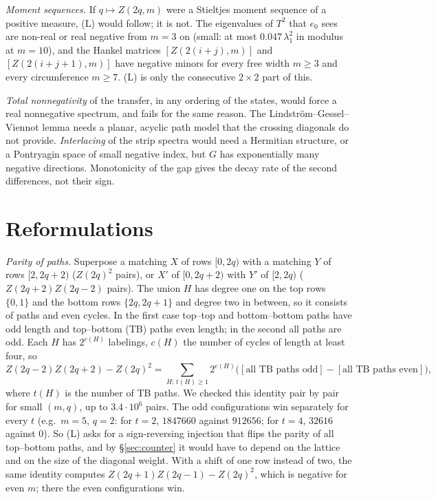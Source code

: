 \documentclass[11pt]{amsart}
\theoremstyle{definition}
\theoremstyle{remark}
\begin{document}
\emph{Moment sequences.} If $q \mapsto Z(2q, m)$ were a Stieltjes moment sequence of a positive
measure, (L) would follow; it is not. The eigenvalues of $T^2$ that $e_0$ sees are non-real or real
negative from $m = 3$ on (small: at most $0.047\,\lambda_1^2$ in modulus at $m = 10$), and the
Hankel matrices $[Z(2(i+j), m)]$ and $[Z(2(i+j+1), m)]$ have negative minors for every free width
$m \ge 3$ and every circumference $m \ge 7$. (L) is only the consecutive $2 \times 2$ part of this.

\emph{Total nonnegativity} of the transfer, in any ordering of the states, would force a real
nonnegative spectrum, and fails for the same reason. The
Lindstr\"om--Gessel--Viennot lemma needs a planar, acyclic path model that the crossing diagonals do
not provide. \emph{Interlacing} of the strip spectra would need a Hermitian structure, or a
Pontryagin space of small negative index, but $G$ has exponentially many negative directions.
Monotonicity of the gap gives the decay rate of the second differences, not their sign.

\section{Reformulations}\label{sec:reform}

\emph{Parity of paths.} Superpose a matching $X$ of rows $[0, 2q)$ with a matching $Y$ of rows
$[2, 2q+2)$ ($Z(2q)^2$ pairs), or $X'$ of $[0, 2q+2)$ with $Y'$ of $[2, 2q)$ ($Z(2q+2)Z(2q-2)$
pairs). The union $H$ has degree one on the top rows $\{0, 1\}$ and the bottom rows $\{2q, 2q+1\}$
and degree two in between, so it consists of paths and even cycles. In the first case top--top and
bottom--bottom paths have odd length and top--bottom (TB) paths even length; in the second all
paths are odd. Each $H$ has $2^{c(H)}$ labelings, $c(H)$ the number of cycles of length at least
four, so
\[
  Z(2q-2)Z(2q+2) - Z(2q)^2 = \sum_{H:\,t(H) \ge 1} 2^{c(H)}
  \bigl([\text{all TB paths odd}] - [\text{all TB paths even}]\bigr),
\]
where $t(H)$ is the number of TB paths. We checked this identity pair by pair for small $(m, q)$,
up to $3.4\cdot10^{6}$ pairs. The odd configurations win separately for every $t$ (e.g.\ $m = 5$,
$q = 2$: for $t = 2$, $1847660$ against $912656$; for $t = 4$, $32616$ against $0$). So (L) asks for
a sign-reversing injection that flips the parity of all top--bottom paths, and by
\S\ref{sec:counter} it would have to depend on the lattice and on the size of the diagonal weight.
With a shift of one row instead of two, the same identity computes $Z(2q+1)Z(2q-1) - Z(2q)^2$,
which is negative for even $m$; there the even configurations win.
\end{document}
